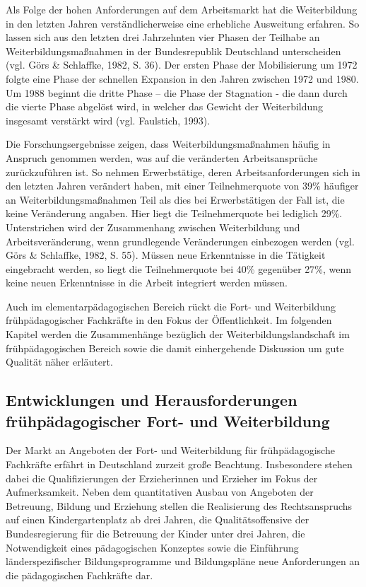 \documentclass[12pt,a4paper]{article}
\begin{document}
	Als Folge der hohen Anforderungen auf dem Arbeitsmarkt hat die Weiterbildung in den letzten Jahren verständlicherweise eine erhebliche Ausweitung erfahren. So lassen sich aus den letzten drei Jahrzehnten vier Phasen der Teilhabe an Weiterbildungsmaßnahmen in der Bundesrepublik Deutschland unterscheiden (vgl. Görs \& Schlaffke, 1982, S. 36). Der ersten Phase der Mobilisierung um 1972 folgte eine Phase der schnellen Expansion in den Jahren zwischen 1972 und 1980. Um 1988 beginnt die dritte Phase – die Phase der Stagnation - die dann durch die vierte Phase abgelöst wird, in welcher das Gewicht der Weiterbildung insgesamt verstärkt wird (vgl. Faulstich, 1993).
	
	Die Forschungsergebnisse zeigen, dass Weiterbildungsmaßnahmen häufig in Anspruch genommen werden, was auf die veränderten Arbeitsansprüche zurückzuführen ist. So nehmen Erwerbstätige, deren Arbeitsanforderungen sich in den letzten Jahren verändert haben, mit einer Teilnehmerquote von 39\% häufiger an Weiterbildungsmaßnahmen Teil als dies bei Erwerbstätigen der Fall ist, die keine Veränderung angaben. Hier liegt die Teilnehmerquote bei lediglich 29\%. Unterstrichen wird der Zusammenhang zwischen Weiterbildung und Arbeitsveränderung, wenn grundlegende Veränderungen einbezogen werden (vgl. Görs \& Schlaffke, 1982, S. 55). Müssen neue Erkenntnisse in die Tätigkeit eingebracht werden, so liegt die Teilnehmerquote bei 40\% gegenüber 27\%, wenn keine neuen Erkenntnisse in die Arbeit integriert werden müssen. 
	
	Auch im elementarpädagogischen Bereich rückt die Fort- und Weiterbildung frühpädagogischer Fachkräfte in den Fokus der Öffentlichkeit. Im folgenden Kapitel werden die Zusammenhänge bezüglich der Weiterbildungslandschaft im frühpädagogischen Bereich sowie die damit einhergehende Diskussion um gute Qualität näher erläutert.

\subsection{Entwicklungen und Herausforderungen früh\-pä\-da\-go\-gi\-scher Fort- und Weiterbildung}

Der Markt an Angeboten der Fort- und Weiterbildung für frühpädagogische Fachkräfte erfährt in Deutschland zurzeit große Beachtung. Insbesondere stehen dabei die Qualifizierungen der Erzieherinnen und Erzieher im Fokus der Aufmerksamkeit. Neben dem quantitativen Ausbau von Angeboten der Betreuung, Bildung und Erziehung stellen die Realisierung des Rechtsanspruchs auf einen Kindergartenplatz ab drei Jahren, die Qualitätsoffensive der Bundesregierung für die Betreuung der Kinder unter drei Jahren, die Not\-wen\-dig\-keit eines pädagogischen Konzeptes sowie  die Einführung länderspezifischer Bildungsprogramme und Bildungspläne neue Anforderungen an die pä\-da\-go\-gi\-schen Fachkräfte dar. 
\end{document}
